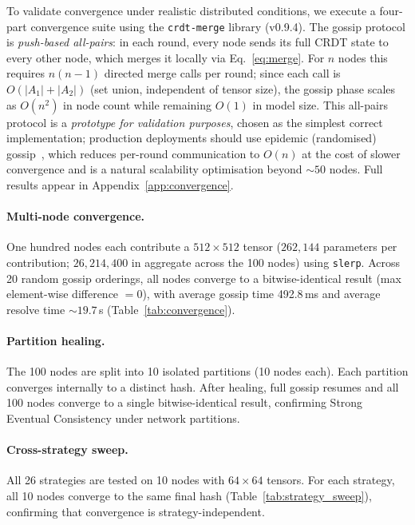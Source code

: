 \documentclass[10pt,letterpaper]{article}
\begin{document}
To validate convergence under realistic distributed conditions, we execute a four-part convergence suite using the \texttt{crdt-merge} library (v0.9.4).
The gossip protocol is \emph{push-based all-pairs}: in each round, every node sends its full CRDT state to every other node, which merges it locally via Eq.~\ref{eq:merge}.
For $n$ nodes this requires $n(n{-}1)$ directed merge calls per round; since each call is $O(|A_1|{+}|A_2|)$ (set union, independent of tensor size), the gossip phase scales as $O(n^2)$ in node count while remaining $O(1)$ in model size.
This all-pairs protocol is a \emph{prototype for validation purposes}, chosen as the simplest correct implementation; production deployments should use epidemic (randomised) gossip~\cite{koloskova2019decentralized}, which reduces per-round communication to $O(n)$ at the cost of slower convergence and is a natural scalability optimisation beyond ${\sim}50$ nodes.
Full results appear in Appendix~\ref{app:convergence}.

\paragraph{Multi-node convergence.}
One hundred nodes each contribute a $512 \times 512$ tensor ($262{,}144$ parameters per contribution; $26{,}214{,}400$ in aggregate across the 100 nodes) using \texttt{slerp}.
Across 20 random gossip orderings, all nodes converge to a bitwise-identical result (max element-wise difference $= 0$), with average gossip time 492.8\,ms and average resolve time ${\sim}19.7$\,s (Table~\ref{tab:convergence}).

\paragraph{Partition healing.}
The 100 nodes are split into 10 isolated partitions (10 nodes each).
Each partition converges internally to a distinct hash.
After healing, full gossip resumes and all 100 nodes converge to a single bitwise-identical result, confirming Strong Eventual Consistency under network partitions.

\paragraph{Cross-strategy sweep.}
All 26 strategies are tested on 10 nodes with $64 \times 64$ tensors.
For each strategy, all 10 nodes converge to the same final hash (Table~\ref{tab:strategy_sweep}), confirming that convergence is strategy-independent.
\end{document}
